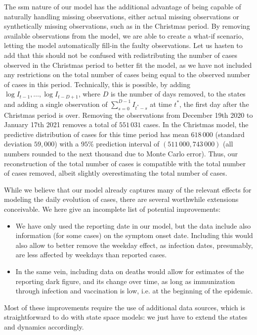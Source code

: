 The \acrshort{ssm} nature of our model has the additional advantage of being capable of naturally handling missing observations, either actual missing observations or synthetically missing observations, such as in the Christmas period. By removing available observations from the model, we are able to create a what-if scenario, letting the model automatically fill-in the faulty observations. Let us hasten to add that this should not be confused with redistributing the number of cases observed in the Christmas period to better fit the model, as we have not included any restrictions on the total number of cases being equal to the observed number of cases in this period. Technically, this is possible, by adding $\log I_{t - 1}, \dots, \log I_{t - D + 1}$, where $D$ is the number of days removed, to the states and adding a single observation of $\sum_{s = 0}^{D - 1} I_{t^{\ast} - s}$ at time $t^{\ast}$, the first day after the Christmas period is over. Removing the observations from December 19th 2020 to January 17th 2021 removes a total of $551\,031$ cases. In the Christmas model, the predictive distribution of cases for this time period has mean $618\,000$ (standard deviation $59,000$) with a $95\%$ prediction interval of $(511\,000, 743\,000)$ (all numbers rounded to the next thousand due to Monte Carlo error). Thus, our reconstruction of the total number of cases is compatible with the total number of cases removed, albeit slightly overestimating the total number of cases.

While we believe that our model already captures many of the relevant effects for modeling the daily evolution of cases, there are several worthwhile extensions conceivable. We here give an incomplete list of potential improvements:
\begin{itemize}
    \item We have only used the reporting date in our model, but the data include also information (for some cases) on the symptom onset date. Including this would also allow to better remove the weekday effect, as infection dates, presumably, are less affected by weekdays than reported cases.
    \item In the same vein, including data on deaths would allow for estimates of the reporting dark figure, and its change over time, as long as immunization through infection and vaccination is low, i.e. at the beginning of the epidemic.
\end{itemize}

Most of these improvements require the use of additional data sources, which is straightforward to do with state space models: we just have to extend the states and dynamics accordingly. 